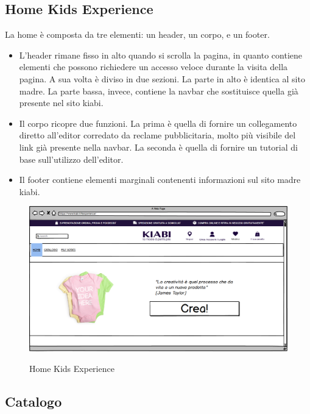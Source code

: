 \documentclass[12pt,italian,]{report}
\begin{document}
\subsection{Home Kids Experience} 

La home è composta da tre elementi: un header, un corpo, e un footer.
\begin{itemize}
\item
L’header rimane fisso in alto quando si scrolla la pagina, in quanto contiene elementi che possono richiedere un accesso veloce durante la visita della pagina. 
A sua volta è diviso in due sezioni. La parte in alto è identica al sito madre. La parte bassa, invece, contiene la navbar che sostituisce quella già presente nel sito kiabi.

\item
Il corpo ricopre due funzioni. 
La prima è quella di fornire un collegamento diretto all'editor corredato da reclame pubblicitaria, molto più visibile del link già presente nella navbar. 
La seconda è quella di fornire un tutorial di base sull'utilizzo dell'editor.

\item Il footer contiene elementi marginali contenenti informazioni sul sito madre kiabi.
\end{itemize}

\begin{figure}[h]
\centering
\includegraphics{balsamiq/Home Sottosito Utente Esterno .png}
\label{kids_home}
\caption{Home Kids Experience}
\end{figure}




\subsection{Catalogo} 
\end{document}

